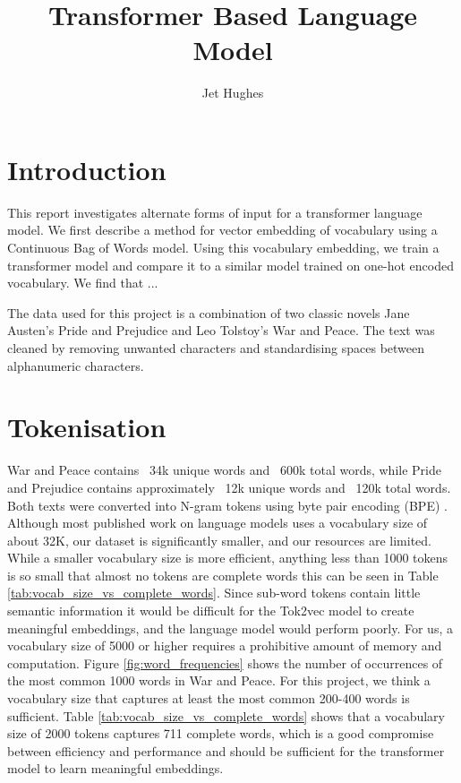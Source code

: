 \documentclass[a4paper, 11pt]{article}
\title{Transformer Based Language Model}
\author{Jet Hughes}
\date{}
\begin{document}
\maketitle


\section{Introduction}
This report investigates alternate forms of input for a transformer language model. We first describe a method for vector embedding of vocabulary using a Continuous Bag of Words model. Using this vocabulary embedding, we train a transformer model and compare it to a similar model trained on one-hot encoded vocabulary. We find that ...

The data used for this project is a combination of two classic novels Jane Austen's Pride and Prejudice and Leo Tolstoy's War and Peace. The text was cleaned by removing unwanted characters and standardising spaces between alphanumeric characters. 

\section{Tokenisation}
War and Peace contains ~34k unique words and ~600k total words, while Pride and Prejudice contains approximately ~12k unique words and ~120k total words. Both texts were converted into N-gram tokens using byte pair encoding (BPE) \cite{sennrich2015neural}. Although most published work on language models uses a vocabulary size of about 32K, our dataset is significantly smaller, and our resources are limited. While a smaller vocabulary size is more efficient, anything less than 1000 tokens is so small that almost no tokens are complete words this can be seen in Table \ref{tab:vocab_size_vs_complete_words}. Since sub-word tokens contain little semantic information it would be difficult for the Tok2vec model to create meaningful embeddings, and the language model would perform poorly. For us, a vocabulary size of 5000 or higher requires a prohibitive amount of memory and computation. Figure \ref{fig:word_frequencies} shows the number of occurrences of the most common 1000 words in War and Peace. For this project, we think a vocabulary size that captures at least the most common 200-400 words is sufficient. Table \ref{tab:vocab_size_vs_complete_words} shows that a vocabulary size of 2000 tokens captures 711 complete words, which is a good compromise between efficiency and performance and should be sufficient for the transformer model to learn meaningful embeddings.
\end{document}
